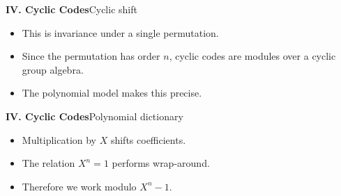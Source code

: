%

\begin{frame}{\textbf{IV. Cyclic Codes}}{Cyclic shift}
\small
{}
\begin{itemize}
  \item This is invariance under a single permutation.
  \item Since the permutation has order $n$, cyclic codes are modules over a cyclic group algebra.
  \item The polynomial model makes this precise.
\end{itemize}
\end{frame}

\begin{frame}{\textbf{IV. Cyclic Codes}}{Polynomial dictionary}
\small
{}
\begin{itemize}
  \item Multiplication by $X$ shifts coefficients.
  \item The relation $X^n=1$ performs wrap-around.
  \item Therefore we work modulo $X^n-1$.
\end{itemize}
\end{frame}

